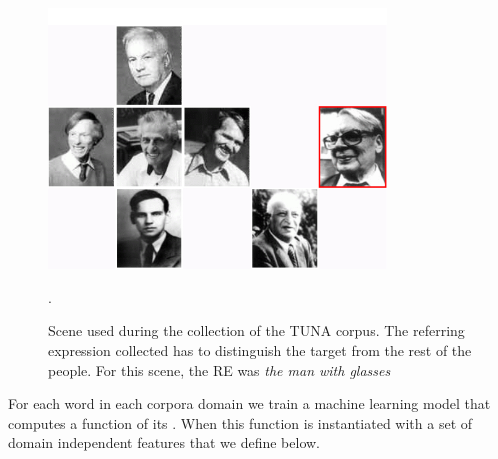 \begin{figure}[ht]
\centering
\includegraphics[width=0.8\textwidth]{images/tuna-people.jpg}

\caption{Scene used during the collection of the TUNA corpus. The referring expression collected has to distinguish the target from the rest of the people. For this scene, the RE was \emph{the man with glasses}}. 
\label{Tuna-people-scene}
\centering

\end{figure}

For each word in each corpora domain we train a machine learning model that computes a function of its \puse. When this function is instantiated with a set of domain independent features that we define below. 



